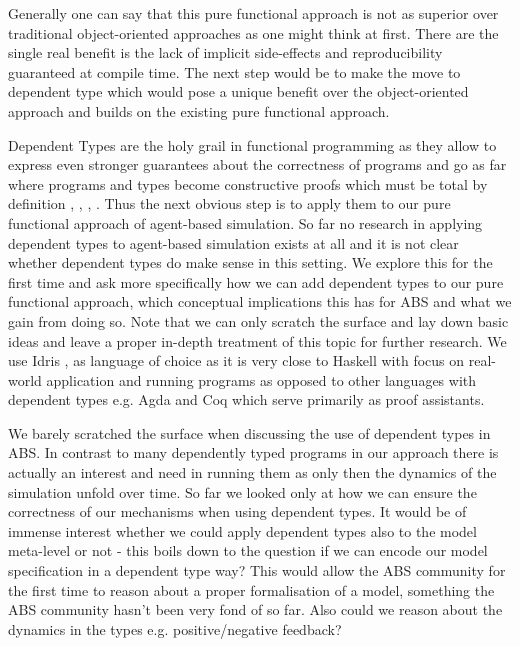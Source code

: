Generally one can say that this pure functional approach is not as superior over traditional object-oriented approaches as one might think at first. There are the single real benefit is the lack of implicit side-effects and reproducibility guaranteed at compile time. The next step would be to make the move to dependent type which would pose a unique benefit over the object-oriented approach and builds on the existing pure functional approach.

Dependent Types are the holy grail in functional programming as they allow to express even stronger guarantees about the correctness of programs and go as far where programs and types become constructive proofs \cite{wadler_propositions_2015} which must be total by definition \cite{thompson_type_1991}, \cite{altenkirch_why_2005}, \cite{altenkirch_pi_sigma:_2010}, \cite{program_homotopy_2013}. Thus the next obvious step is to apply them to our pure functional approach of agent-based simulation. So far no research in applying dependent types to agent-based simulation exists at all and it is not clear whether dependent types do make sense in this setting. We explore this for the first time and ask more specifically how we can add dependent types to our pure functional approach, which conceptual implications this has for ABS and what we gain from doing so. Note that we can only scratch the surface and lay down basic ideas and leave a proper in-depth treatment of this topic for further research. We use Idris \cite{brady_idris_2013}, \cite{brady_type-driven_2017} as language of choice as it is very close to Haskell with focus on real-world application and running programs as opposed to other languages with dependent types e.g. Agda and Coq which serve primarily as proof assistants.

We barely scratched the surface when discussing the use of dependent types in ABS. In contrast to many dependently typed programs in our approach there is actually an interest and need in running them as only then the dynamics of the simulation unfold over time. So far we looked only at how we can ensure the correctness of our mechanisms when using dependent types. It would be of immense interest whether we could apply dependent types also to the model meta-level or not - this boils down to the question if we can encode our model specification in a dependent type way? This would allow the ABS community for the first time to reason about a proper formalisation of a model, something the ABS community hasn't been very fond of so far. Also could we reason about the dynamics in the types e.g. positive/negative feedback?
